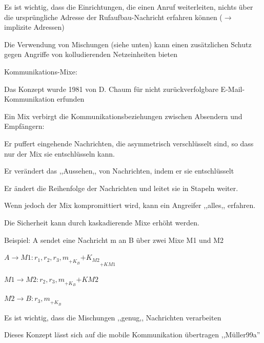 \documentclass[a4paper]{article}
\begin{document}
\begin{multicols}{3}
\begin{itemize*}
\begin{itemize*}
\begin{itemize*}
                        \item Es ist wichtig, dass die Einrichtungen, die einen Anruf weiterleiten, nichts über die ursprüngliche Adresse der Rufaufbau-Nachricht erfahren können ($\rightarrow$ implizite Adressen)
                        \item Die Verwendung von Mischungen (siehe unten) kann einen zusätzlichen Schutz gegen Angriffe von kolludierenden Netzeinheiten bieten
                  \end{itemize*}
            \end{itemize*}
            \item Kommunikations-Mixe:
            \begin{itemize*}
                  \item Das Konzept wurde 1981 von D. Chaum für nicht zurückverfolgbare E-Mail-Kommunikation erfunden
                  \item Ein Mix verbirgt die Kommunikationsbeziehungen zwischen Absendern und Empfängern:
                  \begin{itemize*}
                        \item Er puffert eingehende Nachrichten, die asymmetrisch verschlüsselt sind, so dass nur der Mix sie entschlüsseln kann.
                        \item Er verändert das ,,Aussehen,, von Nachrichten, indem er sie entschlüsselt
                        \item Er ändert die Reihenfolge der Nachrichten und leitet sie in Stapeln weiter.
                        \item Wenn jedoch der Mix kompromittiert wird, kann ein Angreifer ,,alles,, erfahren.
                  \end{itemize*}
                  \item Die Sicherheit kann durch kaskadierende Mixe erhöht werden.
                  \item Beispiel: A sendet eine Nachricht m an B über zwei Mixe M1 und M2
                  \begin{itemize*}
                        \item $A\rightarrow M1: {r_1 ,{r_2 ,{r_3 , m}_{{+K_B}}}{+K_{M2}}}_{{+K}{M1}}$
                        \item $M1\rightarrow M2:{r_2 ,{r_3 , m}_{{+K_B}}}{+K{M2}}$
                        \item $M2\rightarrow B: {r_3 , m}_{+K_B}$
                        \item Es ist wichtig, dass die Mischungen ,,genug,, Nachrichten verarbeiten
                  \end{itemize*}
                  \item Dieses Konzept lässt sich auf die mobile Kommunikation übertragen ,,Müller99a''
            \end{itemize*}
      \end{itemize*}


\end{multicols}
\end{document}
